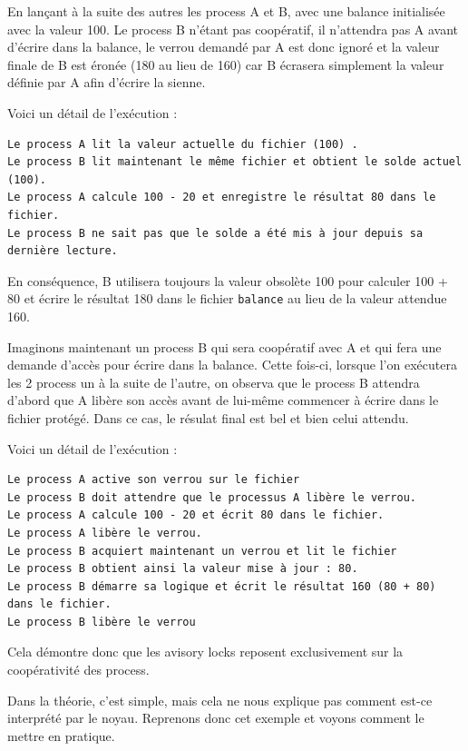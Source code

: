 En lançant à la suite des autres les process A et B, avec une balance initialisée avec la valeur 100. Le process B n'étant pas coopératif, il n'attendra pas A avant d'écrire dans la balance, le verrou demandé par A est donc ignoré et la valeur finale de B est éronée (180 au lieu de 160) car B écrasera simplement la valeur définie par A afin d'écrire la sienne.
\newline

Voici un détail de l'exécution : 
\begin{verbatim}
Le process A lit la valeur actuelle du fichier (100) .
Le process B lit maintenant le même fichier et obtient le solde actuel (100).
Le process A calcule 100 - 20 et enregistre le résultat 80 dans le fichier.
Le process B ne sait pas que le solde a été mis à jour depuis sa dernière lecture.
\end{verbatim}

En conséquence, B utilisera toujours la valeur obsolète 100 pour calculer 100 + 80 et écrire le résultat 180 dans le fichier \texttt{balance} au lieu de la valeur attendue 160.
\newline

Imaginons maintenant un process B qui sera coopératif avec A et qui fera une demande d'accès pour écrire dans la balance. Cette fois-ci, lorsque l'on exécutera les 2 process un à la suite de l'autre, on observa que le process B attendra d'abord que A libère son accès avant de lui-même commencer à écrire dans le fichier protégé. Dans ce cas, le résulat final est bel et bien celui attendu.
\newline

Voici un détail de l'exécution : 
\begin{verbatim}
Le process A active son verrou sur le fichier
Le process B doit attendre que le processus A libère le verrou.
Le process A calcule 100 - 20 et écrit 80 dans le fichier.
Le process A libère le verrou.
Le process B acquiert maintenant un verrou et lit le fichier
Le process B obtient ainsi la valeur mise à jour : 80.
Le process B démarre sa logique et écrit le résultat 160 (80 + 80) dans le fichier.
Le process B libère le verrou
\end{verbatim}

Cela démontre donc que les avisory locks reposent exclusivement sur la coopérativité des process.

Dans la théorie, c'est simple, mais cela ne nous explique pas comment est-ce interprété par le noyau. Reprenons donc cet exemple et voyons comment le mettre en pratique. 
\newline

